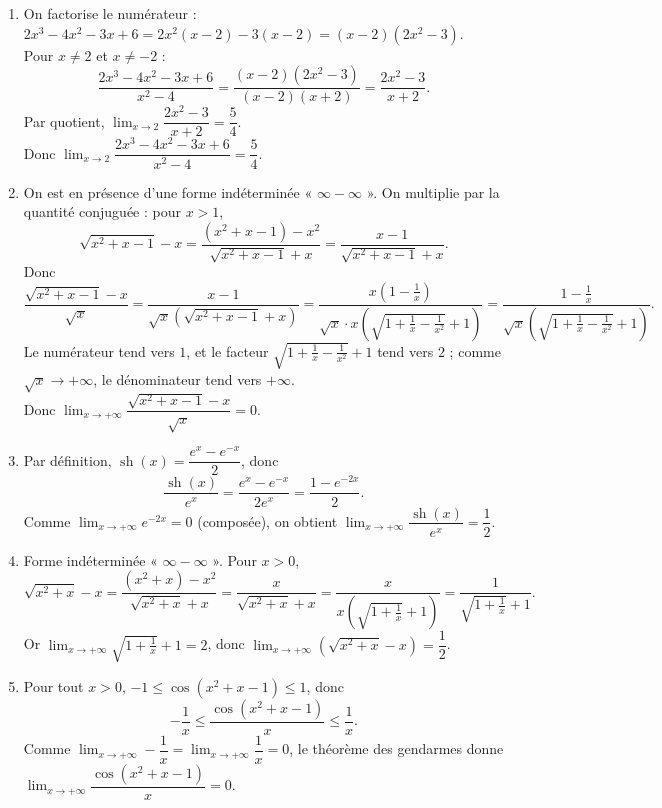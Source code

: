 \documentclass[12pt,a4paper]{article}
\begin{document}
\begin{enumerate}
\item On factorise le numérateur : $2x^3-4x^2-3x+6=2x^2(x-2)-3(x-2)=(x-2)(2x^2-3)$.\\
Pour $x\neq 2$ et $x\neq -2$ :
$$\dfrac{2x^3-4x^2-3x+6}{x^2-4}=\dfrac{(x-2)(2x^2-3)}{(x-2)(x+2)}=\dfrac{2x^2-3}{x+2}.$$
Par quotient, $\displaystyle\lim_{x\to 2}\dfrac{2x^2-3}{x+2}=\dfrac{5}{4}$.\\
Donc $\displaystyle\lim_{x\to 2}\dfrac{2x^3-4x^2-3x+6}{x^2-4}=\dfrac{5}{4}$.

\item On est en présence d'une forme indéterminée « $\infty-\infty$ ». On multiplie par la quantité conjuguée : pour $x>1$,
$$\sqrt{x^2+x-1}-x=\dfrac{(x^2+x-1)-x^2}{\sqrt{x^2+x-1}+x}=\dfrac{x-1}{\sqrt{x^2+x-1}+x}.$$
Donc
$$\dfrac{\sqrt{x^2+x-1}-x}{\sqrt{x}}=\dfrac{x-1}{\sqrt{x}\left(\sqrt{x^2+x-1}+x\right)}=\dfrac{x\left(1-\frac{1}{x}\right)}{\sqrt{x}\cdot x\left(\sqrt{1+\frac{1}{x}-\frac{1}{x^2}}+1\right)}=\dfrac{1-\frac{1}{x}}{\sqrt{x}\left(\sqrt{1+\frac{1}{x}-\frac{1}{x^2}}+1\right)}.$$
Le numérateur tend vers $1$, et le facteur $\sqrt{1+\frac{1}{x}-\frac{1}{x^2}}+1$ tend vers $2$ ; comme $\sqrt{x}\to+\infty$, le dénominateur tend vers $+\infty$.\\
Donc $\displaystyle\lim_{x\to +\infty}\dfrac{\sqrt{x^2+x-1}-x}{\sqrt{x}}=0$.

\item Par définition, $\operatorname{sh}(x)=\dfrac{e^x-e^{-x}}{2}$, donc
$$\dfrac{\operatorname{sh}(x)}{e^x}=\dfrac{e^x-e^{-x}}{2e^x}=\dfrac{1-e^{-2x}}{2}.$$
Comme $\displaystyle\lim_{x\to+\infty}e^{-2x}=0$ (composée), on obtient $\displaystyle\lim_{x\to +\infty}\dfrac{\operatorname{sh}(x)}{e^x}=\dfrac{1}{2}$.

\item Forme indéterminée « $\infty-\infty$ ». Pour $x>0$,
$$\sqrt{x^2+x}-x=\dfrac{(x^2+x)-x^2}{\sqrt{x^2+x}+x}=\dfrac{x}{\sqrt{x^2+x}+x}=\dfrac{x}{x\left(\sqrt{1+\frac{1}{x}}+1\right)}=\dfrac{1}{\sqrt{1+\frac{1}{x}}+1}.$$
Or $\displaystyle\lim_{x\to+\infty}\sqrt{1+\frac{1}{x}}+1=2$, donc $\displaystyle\lim_{x\to +\infty}\left(\sqrt{x^2+x}-x\right)=\dfrac{1}{2}$.

\item Pour tout $x>0$, $-1\leq\cos(x^2+x-1)\leq 1$, donc
$$-\dfrac{1}{x}\leq\dfrac{\cos(x^2+x-1)}{x}\leq\dfrac{1}{x}.$$
Comme $\displaystyle\lim_{x\to+\infty}-\dfrac{1}{x}=\lim_{x\to+\infty}\dfrac{1}{x}=0$, le théorème des gendarmes donne $\displaystyle\lim_{x\to +\infty}\dfrac{\cos(x^2+x-1)}{x}=0$.
\end{enumerate}
\end{document}
